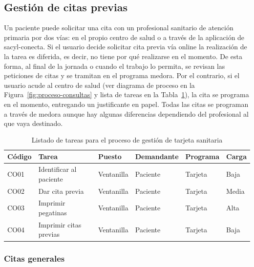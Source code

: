 \subsection{Gestión de citas previas}

Un paciente puede solicitar una cita con un profesional sanitario de atención primaria por dos vías: en el propio centro de salud o a través de la aplicación de \Gls{sacyl-conecta}.
Si el usuario decide solicitar cita previa vía online la realización de la tarea es diferida, es decir, no tiene por qué realizarse en el momento.
De esta forma, al final de la jornada o cuando el trabajo lo permita, se revisan las peticiones de citas y se tramitan en el programa \Gls{medora}.
Por el contrario, si el usuario acude al centro de salud (ver diagrama de proceso en la Figura~\ref{fig:proceso-consultas} y lista de tareas en la Tabla~\ref{tab:proceso-consultas}), la cita se programa en el momento, entregando un justificante en papel.
Todas las citas se programan a través de \Gls{medora} aunque hay algunas diferencias dependiendo del profesional al que vaya destinado.

\begin{table}[H]
    \begin{tabular}{lp{5cm}llll}
        \toprule
        Código & Tarea                   & Puesto     & Demandante & Programa & Carga \\
        \midrule
        CO01   & Identificar al paciente & Ventanilla & Paciente   & Tarjeta  & Baja  \\
        CO02   & Dar cita previa         & Ventanilla & Paciente   & Tarjeta  & Media \\
        CO03   & Imprimir pegatinas      & Ventanilla & Paciente   & Tarjeta  & Alta  \\
        CO04   & Imprimir citas previas  & Ventanilla & Paciente   & Tarjeta  & Baja  \\
        \bottomrule
    \end{tabular}
    \caption{Listado de tareas para el proceso de gestión de tarjeta sanitaria}
    \label{tab:proceso-consultas}
\end{table}

\subsubsection{Citas generales}

